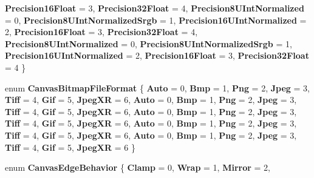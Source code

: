 \begin{DoxyCompactItemize}
{\bfseries Precision16\+Float} = 3, 
{\bfseries Precision32\+Float} = 4, 
{\bfseries Precision8\+U\+Int\+Normalized} = 0, 
\newline
{\bfseries Precision8\+U\+Int\+Normalized\+Srgb} = 1, 
{\bfseries Precision16\+U\+Int\+Normalized} = 2, 
{\bfseries Precision16\+Float} = 3, 
{\bfseries Precision32\+Float} = 4, 
\newline
{\bfseries Precision8\+U\+Int\+Normalized} = 0, 
{\bfseries Precision8\+U\+Int\+Normalized\+Srgb} = 1, 
{\bfseries Precision16\+U\+Int\+Normalized} = 2, 
{\bfseries Precision16\+Float} = 3, 
\newline
{\bfseries Precision32\+Float} = 4
 \}
\item 
\mbox{\label{namespace_microsoft_1_1_graphics_1_1_canvas_a912d98ef415ce79b96eeb1280290df73}} 
enum {\bfseries Canvas\+Bitmap\+File\+Format} \{ \newline
{\bfseries Auto} = 0, 
{\bfseries Bmp} = 1, 
{\bfseries Png} = 2, 
{\bfseries Jpeg} = 3, 
\newline
{\bfseries Tiff} = 4, 
{\bfseries Gif} = 5, 
{\bfseries Jpeg\+XR} = 6, 
{\bfseries Auto} = 0, 
\newline
{\bfseries Bmp} = 1, 
{\bfseries Png} = 2, 
{\bfseries Jpeg} = 3, 
{\bfseries Tiff} = 4, 
\newline
{\bfseries Gif} = 5, 
{\bfseries Jpeg\+XR} = 6, 
{\bfseries Auto} = 0, 
{\bfseries Bmp} = 1, 
\newline
{\bfseries Png} = 2, 
{\bfseries Jpeg} = 3, 
{\bfseries Tiff} = 4, 
{\bfseries Gif} = 5, 
\newline
{\bfseries Jpeg\+XR} = 6, 
{\bfseries Auto} = 0, 
{\bfseries Bmp} = 1, 
{\bfseries Png} = 2, 
\newline
{\bfseries Jpeg} = 3, 
{\bfseries Tiff} = 4, 
{\bfseries Gif} = 5, 
{\bfseries Jpeg\+XR} = 6, 
\newline
{\bfseries Auto} = 0, 
{\bfseries Bmp} = 1, 
{\bfseries Png} = 2, 
{\bfseries Jpeg} = 3, 
\newline
{\bfseries Tiff} = 4, 
{\bfseries Gif} = 5, 
{\bfseries Jpeg\+XR} = 6
 \}
\item 
\mbox{\label{namespace_microsoft_1_1_graphics_1_1_canvas_a0820dd282edd1b22994fc94021da353e}} 
enum {\bfseries Canvas\+Edge\+Behavior} \{ \newline
{\bfseries Clamp} = 0, 
{\bfseries Wrap} = 1, 
{\bfseries Mirror} = 2, 

\end{DoxyCompactItemize}
